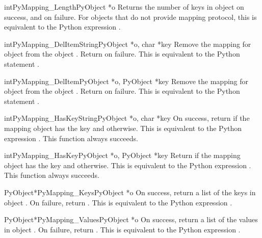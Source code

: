 \documentclass{manual}
\begin{document}
\begin{cfuncdesc}{int}{PyMapping_Length}{PyObject *o}
Returns the number of keys in object  on success, and
 on failure.  For objects that do not provide mapping
protocol, this is equivalent to the Python expression
.
\end{cfuncdesc}


\begin{cfuncdesc}{int}{PyMapping_DelItemString}{PyObject *o, char *key}
Remove the mapping for object  from the object .
Return  on failure.  This is equivalent to
the Python statement .
\end{cfuncdesc}


\begin{cfuncdesc}{int}{PyMapping_DelItem}{PyObject *o, PyObject *key}
Remove the mapping for object  from the object .
Return  on failure.  This is equivalent to
the Python statement .
\end{cfuncdesc}


\begin{cfuncdesc}{int}{PyMapping_HasKeyString}{PyObject *o, char *key}
On success, return  if the mapping object has the key
 and  otherwise.  This is equivalent to the Python
expression . 
This function always succeeds.
\end{cfuncdesc}


\begin{cfuncdesc}{int}{PyMapping_HasKey}{PyObject *o, PyObject *key}
Return  if the mapping object has the key  and
 otherwise.  This is equivalent to the Python expression
. 
This function always succeeds.
\end{cfuncdesc}


\begin{cfuncdesc}{PyObject*}{PyMapping_Keys}{PyObject *o}
On success, return a list of the keys in object .  On
failure, return \NULL{}. This is equivalent to the Python
expression .
\end{cfuncdesc}


\begin{cfuncdesc}{PyObject*}{PyMapping_Values}{PyObject *o}
On success, return a list of the values in object .  On
failure, return \NULL{}. This is equivalent to the Python
expression .
\end{cfuncdesc}
\end{document}
